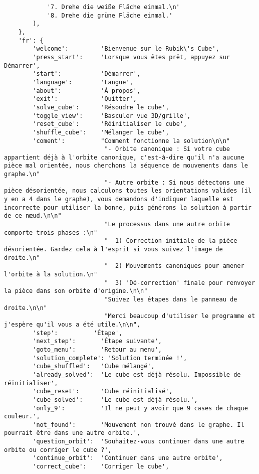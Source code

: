 \begin{lstlisting}
            '7. Drehe die weiße Fläche einmal.\n'
            '8. Drehe die grüne Fläche einmal.'
        ),
    },
    'fr': {
        'welcome':         'Bienvenue sur le Rubik\'s Cube',
        'press_start':     'Lorsque vous êtes prêt, appuyez sur Démarrer',
        'start':           'Démarrer',
        'language':        'Langue',
        'about':           'À propos',
        'exit':            'Quitter',
        'solve_cube':      'Résoudre le cube',
        'toggle_view':     'Basculer vue 3D/grille',
        'reset_cube':      'Réinitialiser le cube',
        'shuffle_cube':    'Mélanger le cube',
        'coment':          "Comment fonctionne la solution\n\n"
                            "- Orbite canonique : Si votre cube appartient déjà à l'orbite canonique, c'est-à-dire qu'il n'a aucune pièce mal orientée, nous cherchons la séquence de mouvements dans le graphe.\n"
                            "- Autre orbite : Si nous détectons une pièce désorientée, nous calculons toutes les orientations valides (il y en a 4 dans le graphe), vous demandons d'indiquer laquelle est incorrecte pour utiliser la bonne, puis générons la solution à partir de ce nœud.\n\n"
                            "Le processus dans une autre orbite comporte trois phases :\n"
                            "  1) Correction initiale de la pièce désorientée. Gardez cela à l'esprit si vous suivez l'image de droite.\n"
                            "  2) Mouvements canoniques pour amener l'orbite à la solution.\n"
                            "  3) 'Dé-correction' finale pour renvoyer la pièce dans son orbite d'origine.\n\n"
                            "Suivez les étapes dans le panneau de droite.\n\n"
                            "Merci beaucoup d'utiliser le programme et j'espère qu'il vous a été utile.\n\n",
        'step':          'Étape',
        'next_step':       'Étape suivante',
        'goto_menu':       'Retour au menu',
        'solution_complete': 'Solution terminée !',
        'cube_shuffled':   'Cube mélangé',
        'already_solved':  'Le cube est déjà résolu. Impossible de réinitialiser',
        'cube_reset':      'Cube réinitialisé',
        'cube_solved':     'Le cube est déjà résolu.',
        'only_9':          'Il ne peut y avoir que 9 cases de chaque couleur.',
        'not_found':       'Mouvement non trouvé dans le graphe. Il pourrait être dans une autre orbite.',
        'question_orbit':  'Souhaitez-vous continuer dans une autre orbite ou corriger le cube ?',
        'continue_orbit':  'Continuer dans une autre orbite',
        'correct_cube':    'Corriger le cube',

\end{lstlisting}
